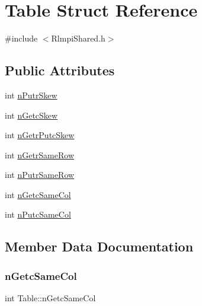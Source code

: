 \hypertarget{structTable}{}\section{Table Struct Reference}
\label{structTable}


{\ttfamily \#include $<$Rlmpi\+Shared.\+h$>$}

\subsection*{Public Attributes}
\begin{DoxyCompactItemize}
\item 
int \mbox{\hyperlink{structTable_abaa376dbdfd0bb7e58848d885c4abf8a}{n\+Putr\+Skew}}
\item 
int \mbox{\hyperlink{structTable_a3485bf7f1fd89d20ebf39a314fe06e50}{n\+Getc\+Skew}}
\item 
int \mbox{\hyperlink{structTable_a0a189e7c259b5928fe37fe925af39457}{n\+Getr\+Putc\+Skew}}
\item 
int \mbox{\hyperlink{structTable_a4a1f490624c67ce3cf6267323763dcf3}{n\+Getr\+Same\+Row}}
\item 
int \mbox{\hyperlink{structTable_a994c14df0db5b56f19131c2c03727cfe}{n\+Putr\+Same\+Row}}
\item 
int \mbox{\hyperlink{structTable_aa2ad06bfcbd3c999a48ce1833467b68f}{n\+Getc\+Same\+Col}}
\item 
int \mbox{\hyperlink{structTable_aaa52fdc877987bc5916ba10a9d1aaaab}{n\+Putc\+Same\+Col}}
\end{DoxyCompactItemize}


\subsection{Member Data Documentation}
\mbox{\label{structTable_aa2ad06bfcbd3c999a48ce1833467b68f}} 
\subsubsection{\texorpdfstring{nGetcSameCol}{nGetcSameCol}}
{\footnotesize\ttfamily int Table\+::n\+Getc\+Same\+Col}

\mbox{\label{structTable_a3485bf7f1fd89d20ebf39a314fe06e50}} 
